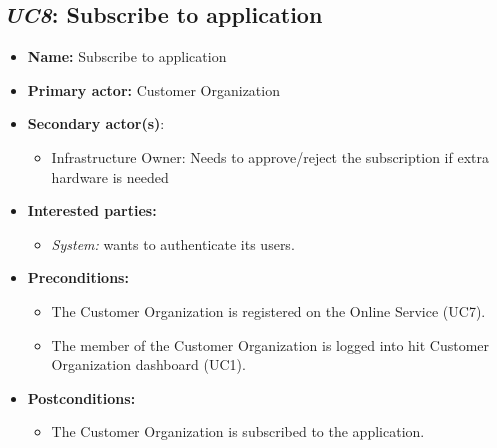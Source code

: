 \documentclass[english]{sareport}
\begin{document}
\subsection{\emph{UC8}: Subscribe to application}
\begin{itemize}
    \item \textbf{Name:} Subscribe to application
    \item \textbf{Primary actor:} Customer Organization
    \item \textbf{Secondary actor(s)}: 
	\begin{itemize}
		\item Infrastructure Owner: Needs to approve/reject the subscription if extra hardware is needed
	\end{itemize}
    \item \textbf{Interested parties:} 
        \begin{itemize}
            \item \textit{System:} wants to authenticate its users.
        \end{itemize}

    \item \textbf{Preconditions:}
        \begin{itemize}
            \item The Customer Organization is registered on the Online Service (UC7).
            \item The member of the Customer Organization is logged into hit Customer Organization dashboard (UC1).
        \end{itemize}

    \item \textbf{Postconditions:}
        \begin{itemize}
            \item The Customer Organization is subscribed to the application.

        \end{itemize}


\end{itemize}
\end{document}
